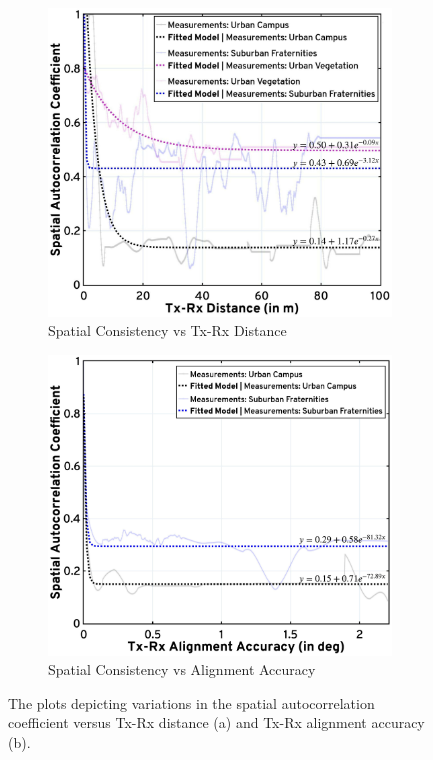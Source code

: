 \documentclass[10pt, twocolumn]{IEEEtran}
\begin{document}
\begin{figure} [t]
     \centering
     \begin{subfigure}{0.496\linewidth}
         \centering
         \includegraphics[width=0.81\linewidth]{figs/sc_distance_annotated.jpg}
         \caption{Spatial Consistency vs Tx-Rx Distance}
         \label{F7a}
     \end{subfigure}
     \begin{subfigure}{0.496\linewidth}
         \centering
         \includegraphics[width=0.825\linewidth]{figs/sc_alignment_annotated.jpg}
         \caption{Spatial Consistency vs Alignment Accuracy}
         \label{F7b}
     \end{subfigure}
     \vspace{-5mm}
     \caption{The plots depicting variations in the spatial autocorrelation coefficient versus Tx-Rx distance (a) and Tx-Rx alignment accuracy (b).}
     \label{F7}
     \vspace{-7mm}
\end{figure}
\vspace{-12mm}
\end{document}
